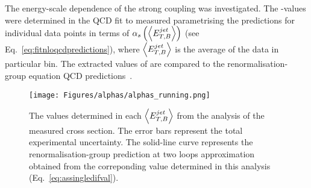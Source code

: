 The energy-scale dependence of the strong coupling was investigated. The \as-values were determined in the QCD fit to measured \dsdetjetb parametrising the predictions for individual \dsdetjetb data points in terms of $\mbox{$\alpha_{s}$}\left(\left<\mbox{$E_{T,B}^{jet}$}\right>\right)$ (see Eq.~\eqref{eq:fitnloqcdpredictions}), where $\left<\mbox{$E_{T,B}^{jet}$}\right>$ is the average \etjetb of the data in particular bin. The extracted values of \as are compared to the renormalisation-group equation QCD predictions~\cite{Gross:1973id,Politzer:1973fx,Gross:1973ju,Politzer:1974fr}.

\begin{figure}
 \centering
 \texttt{[image: Figures/alphas/alphas\_running.png]}
 \caption{The \as values determined in each $\left<\mbox{$E_{T,B}^{jet}$}\right>$ from the analysis of the measured \dsdetjetb cross section. The error bars represent the total experimental uncertainty. The solid-line curve represents the renormalisation-group prediction at two loops approximation obtained from the correponding \asz value determined in this analysis (Eq.~\eqref{eq:assingledifval}).}
 \label{fig:asrunning}
\end{figure}



